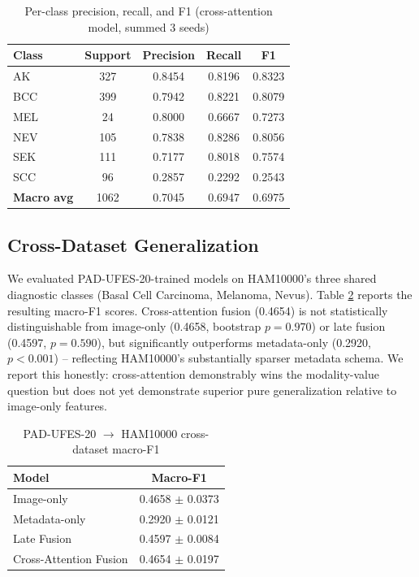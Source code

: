 \documentclass[conference]{IEEEtran}
\begin{document}
\begin{table}[t]
\caption{Per-class precision, recall, and F1 (cross-attention model, summed 3 seeds)}
\label{tab:perclass}
\centering
\begin{tabular}{|l|c|c|c|c|}
\hline
\textbf{Class} & \textbf{Support} & \textbf{Precision} & \textbf{Recall} & \textbf{F1} \\
\hline
AK & 327 & 0.8454 & 0.8196 & 0.8323 \\
\hline
BCC & 399 & 0.7942 & 0.8221 & 0.8079 \\
\hline
MEL & 24 & 0.8000 & 0.6667 & 0.7273 \\
\hline
NEV & 105 & 0.7838 & 0.8286 & 0.8056 \\
\hline
SEK & 111 & 0.7177 & 0.8018 & 0.7574 \\
\hline
SCC & 96 & 0.2857 & 0.2292 & 0.2543 \\
\hline
\textbf{Macro avg} & 1062 & 0.7045 & 0.6947 & 0.6975 \\
\hline
\end{tabular}
\end{table}

\subsection{Cross-Dataset Generalization}
We evaluated PAD-UFES-20-trained models on HAM10000's three shared diagnostic classes (Basal Cell Carcinoma, Melanoma, Nevus). Table \ref{tab:crossdataset} reports the resulting macro-F1 scores. Cross-attention fusion (0.4654) is not statistically distinguishable from image-only (0.4658, bootstrap $p=0.970$) or late fusion (0.4597, $p=0.590$), but significantly outperforms metadata-only (0.2920, $p<0.001$) -- reflecting HAM10000's substantially sparser metadata schema. We report this honestly: cross-attention demonstrably wins the modality-value question but does not yet demonstrate superior pure generalization relative to image-only features.

\begin{table}[t]
\caption{PAD-UFES-20 $\rightarrow$ HAM10000 cross-dataset macro-F1}
\label{tab:crossdataset}
\centering
\begin{tabular}{|l|c|}
\hline
\textbf{Model} & \textbf{Macro-F1} \\
\hline
Image-only & 0.4658 $\pm$ 0.0373 \\
\hline
Metadata-only & 0.2920 $\pm$ 0.0121 \\
\hline
Late Fusion & 0.4597 $\pm$ 0.0084 \\
\hline
Cross-Attention Fusion & 0.4654 $\pm$ 0.0197 \\
\hline
\end{tabular}
\end{table}
\end{document}
